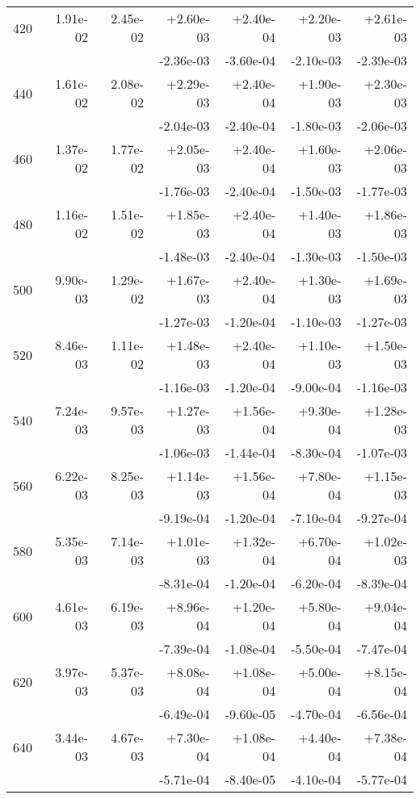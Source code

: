 \begin{tabular}{|c|r|r|r|r|r|r|}
\hline
420 & 1.91e-02 & 2.45e-02 & +2.60e-03 & +2.40e-04 & +2.20e-03 & +2.61e-03 \\
 & & & -2.36e-03 & -3.60e-04 & -2.10e-03 & -2.39e-03 \\
\hline
440 & 1.61e-02 & 2.08e-02 & +2.29e-03 & +2.40e-04 & +1.90e-03 & +2.30e-03 \\
 & & & -2.04e-03 & -2.40e-04 & -1.80e-03 & -2.06e-03 \\
\hline
460 & 1.37e-02 & 1.77e-02 & +2.05e-03 & +2.40e-04 & +1.60e-03 & +2.06e-03 \\
 & & & -1.76e-03 & -2.40e-04 & -1.50e-03 & -1.77e-03 \\
\hline
480 & 1.16e-02 & 1.51e-02 & +1.85e-03 & +2.40e-04 & +1.40e-03 & +1.86e-03 \\
 & & & -1.48e-03 & -2.40e-04 & -1.30e-03 & -1.50e-03 \\
\hline
500 & 9.90e-03 & 1.29e-02 & +1.67e-03 & +2.40e-04 & +1.30e-03 & +1.69e-03 \\
 & & & -1.27e-03 & -1.20e-04 & -1.10e-03 & -1.27e-03 \\
\hline
520 & 8.46e-03 & 1.11e-02 & +1.48e-03 & +2.40e-04 & +1.10e-03 & +1.50e-03 \\
 & & & -1.16e-03 & -1.20e-04 & -9.00e-04 & -1.16e-03 \\
\hline
540 & 7.24e-03 & 9.57e-03 & +1.27e-03 & +1.56e-04 & +9.30e-04 & +1.28e-03 \\
 & & & -1.06e-03 & -1.44e-04 & -8.30e-04 & -1.07e-03 \\
\hline
560 & 6.22e-03 & 8.25e-03 & +1.14e-03 & +1.56e-04 & +7.80e-04 & +1.15e-03 \\
 & & & -9.19e-04 & -1.20e-04 & -7.10e-04 & -9.27e-04 \\
\hline
580 & 5.35e-03 & 7.14e-03 & +1.01e-03 & +1.32e-04 & +6.70e-04 & +1.02e-03 \\
 & & & -8.31e-04 & -1.20e-04 & -6.20e-04 & -8.39e-04 \\
\hline
600 & 4.61e-03 & 6.19e-03 & +8.96e-04 & +1.20e-04 & +5.80e-04 & +9.04e-04 \\
 & & & -7.39e-04 & -1.08e-04 & -5.50e-04 & -7.47e-04 \\
\hline
620 & 3.97e-03 & 5.37e-03 & +8.08e-04 & +1.08e-04 & +5.00e-04 & +8.15e-04 \\
 & & & -6.49e-04 & -9.60e-05 & -4.70e-04 & -6.56e-04 \\
\hline
640 & 3.44e-03 & 4.67e-03 & +7.30e-04 & +1.08e-04 & +4.40e-04 & +7.38e-04 \\
 & & & -5.71e-04 & -8.40e-05 & -4.10e-04 & -5.77e-04 \\

\end{tabular}
